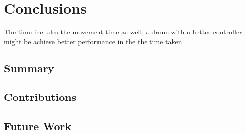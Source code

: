 \documentclass[../report.tex]{subfiles}
\begin{document}
    \section{Conclusions}
    \label{sec:conclusions}
    The time includes the movement time as well, a drone with a better controller might be achieve better performance in the the time taken. 

    \subsection{Summary}
    \label{sec:conclusions:summary}

    \subsection{Contributions}
    \label{sec:conclusions:contributions}

    \subsection{Future Work}
    \label{sec:conclusions:future_work}
\end{document}
